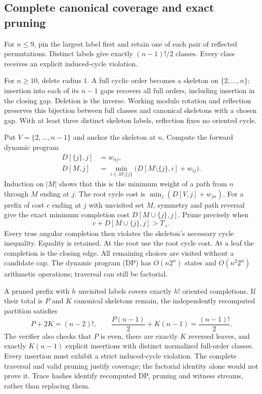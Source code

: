 \documentclass[11pt]{article}
\theoremstyle{definition}
\theoremstyle{remark}
\begin{document}
\subsection{Complete canonical coverage and exact pruning}
For $n\le9$, pin the largest label first and retain one of each pair of
reflected permutations. Distinct labels give exactly $(n-1)!/2$ classes.
Every class receives an explicit induced-cycle violation.

For $n\ge10$, delete radius $1$. A full cyclic order becomes a skeleton
on $\{2,\ldots,n\}$; insertion into each of its $n-1$ gaps recovers
all full orders, including insertion in the closing gap. Deletion is the
inverse. Working modulo rotation and reflection preserves this bijection
between full classes and canonical skeletons with a chosen gap. With at
least three distinct skeleton labels, reflection fixes no oriented cycle.

Put $V=\{2,\ldots,n-1\}$ and anchor the skeleton at $n$. Compute the
forward dynamic program
\begin{align}
 D[\{j\},j]&=w_{nj},\nonumber\\
 D[M,j]&=\min_{i\in M\setminus\{j\}}
           \bigl(D[M\setminus\{j\},i]+w_{ij}\bigr).
 \label{eq:dp}
\end{align}
Induction on $|M|$ shows that this is the minimum weight of a path from
$n$ through $M$ ending at $j$. The root cycle cost is
$\min_j(D[V,j]+w_{jn})$. For a prefix of cost $c$ ending at $j$ with
unvisited set $M$, symmetry and path reversal give the exact minimum
completion cost $D[M\cup\{j\},j]$. Prune precisely when
\begin{equation}\label{eq:prune}
 c+D[M\cup\{j\},j]>T_+.
\end{equation}
Every true angular completion then violates the skeleton's necessary cycle
inequality. Equality is retained. At the root use the root cycle cost.
At a leaf the completion is the closing edge. All remaining choices are
visited without a candidate cap. The dynamic program (DP) has
$O(n2^n)$ states and
$O(n^2 2^n)$ arithmetic operations; traversal can still be factorial.

A pruned prefix with $h$ unvisited labels covers exactly $h!$ oriented
completions. If their total is $P$ and $K$ canonical skeletons remain,
the independently recomputed partition satisfies
\begin{equation}\label{eq:coverage}
 P+2K=(n-2)!,\qquad
 \frac{P(n-1)}2+K(n-1)=\frac{(n-1)!}2.
\end{equation}
The verifier also checks that $P$ is even, there are exactly $K$ reversed
leaves, and exactly $K(n-1)$ explicit insertions with distinct normalized
full-order classes. Every insertion must exhibit a strict induced-cycle
violation. The complete traversal and valid pruning justify coverage;
the factorial identity alone would not prove it. Trace hashes identify
recomputed DP, pruning and witness streams, rather than replacing them.
\end{document}
